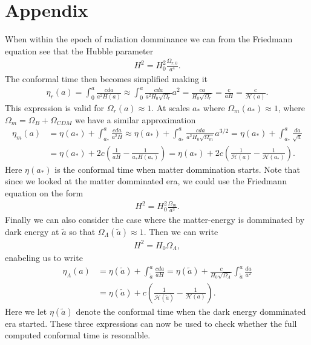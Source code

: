 \documentclass[twocolumn]{aastex62}
\begin{document}
\section{Appendix}
When within the epoch of radiation domminance we can from the Friedmann equation
see that the Hubble parameter
\begin{align}
    H^2 = H_0^2 \frac{\Omega_{r,0}}{a^4}.
\end{align}
The conformal time then becomes simplified making it 
\begin{align}
    \eta_r(a) = \int_0^a \frac{c da}{a^2 H(a)} \approx \int_0^a\frac{c da}{a^2 H_0 \sqrt{\Omega_r}}a^2 = \frac{ca}{H_0\sqrt{\Omega_r}} = \frac{c}{aH} = \frac{c}{\mathcal{H}(a)}. 
\end{align}
This expression is valid for $\Omega_r(a) \approx 1$. At scales $a_*$ where $\Omega_m(a_*)\approx
1$, where $\Omega_m = \Omega_B + \Omega_{CDM}$ we have a similar approximation
\begin{align}
    \eta_m(a) &= \eta(a_*) + \int_{a_*}^a \frac{cda}{a^2H} \approx \eta(a_*) + \int_{a_*}^a \frac{cda}{a^2H_0\sqrt{\Omega_m}}a^{3/2} = \eta(a_*) + \int_{a_*}^a \frac{da}{\sqrt{a}} \\
    &= \eta(a_*) + 2c\left(\frac{1}{aH} - \frac{1}{a_*H(a_*)}\right) = \eta(a_*) + 2c\left(\frac{1}{\mathcal{H}(a)} - \frac{1}{\mathcal{H}(a_*)}\right).
\end{align}
Here $\eta(a_*)$ is the conformal time when matter dommination starts. Note that
since we looked at the matter domminated era, we could use the Friedmann
equation on the form 
\begin{align}
    H^2 = H_0^2 \frac{\Omega_m}{a^3}.
\end{align}
Finally we can also consider the case where the matter-energy is domminated by
dark energy at $\tilde{a}$ so that $\Omega_\Lambda(\tilde{a})\approx 1$. Then we
can write 
\begin{align}
    H^2 = H_0 \Omega_\Lambda, 
\end{align}
enabeling us to write 
\begin{align}
    \eta_\Lambda(a) &= \eta(\tilde{a}) + \int_{\tilde{a}}^a\frac{cda}{aH} = \eta(\tilde{a}) + \frac{c}{H_0\sqrt{\Omega_\Lambda}}\int_{\tilde{a}}^a\frac{da}{a^2} \\
    &= \eta(\tilde{a}) + c\left(\frac{1}{\mathcal{H}(\tilde{a})} - \frac{1}{\mathcal{H}(a)}\right).
\end{align}
Here we let $\eta(\tilde{a})$ denote the conformal time when the dark energy
domminated era started. These three expressions can now be used to check whether
the full computed conformal time is resonalble.
\end{document}

